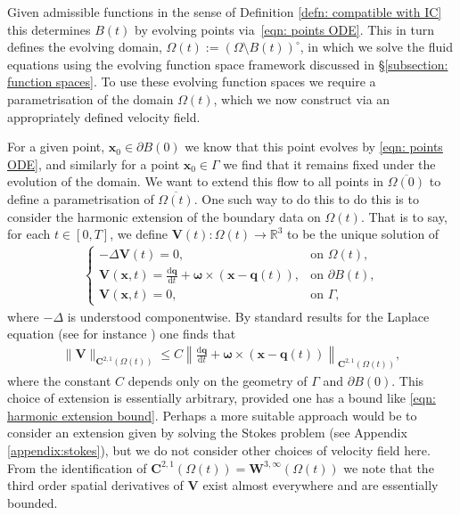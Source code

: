 \documentclass[a4paper]{amsart}
\numberwithin{equation}{section}
\theoremstyle{plain}
\newcommand{\mbf}[1]{\mathbf{#1}}
\newcommand{\mbb}[1]{\mathbb{#1}}
\begin{document}
Given admissible functions in the sense of Definition \ref{defn: compatible with IC} this determines $B(t)$ by evolving points via~\eqref{eqn: points ODE}.
This in turn defines the evolving domain, $\Omega(t) := (\Omega\setminus B(t))^\circ$, in which we solve the fluid equations using the evolving function space framework discussed in \S\ref{subsection: function spaces}.
To use these evolving function spaces we require a parametrisation of the domain $\Omega(t)$, which we now construct via an appropriately defined velocity field.

For a given point, $\mbf{x}_0 \in \partial B(0)$ we know that this point evolves by \eqref{eqn: points ODE}, and similarly for a point $\mbf{x}_0 \in \Gamma$ we find that it remains fixed under the evolution of the domain.
We want to extend this flow to all points in $\overline{\Omega(0)}$ to define a parametrisation of $\overline{\Omega(t)}$.
One such way to do this to do this is to consider the harmonic extension of the boundary data on $\Omega(t)$.
That is to say, for each $t \in [0,T]$, we define $\mbf{V}(t) : \Omega(t) \rightarrow \mbb{R}^3$ to be the unique solution of
\begin{gather}
	\begin{cases}
	-\Delta \mbf{V}(t) = 0, &\text{on } \Omega(t),\\
	\mbf{V}(\mbf{x},t) = \frac{\mathrm{d}\mbf{q}}{\mathrm{d}t} + \boldsymbol{\omega} \times (\mbf{x} - \mbf{q}(t)), &\text{on } \partial B(t),\\
	\mbf{V}(\mbf{x},t) = 0, &\text{on } \Gamma,
\end{cases}\label{eqn: velocity harmonic extension}
\end{gather}
where $-\Delta$ is understood componentwise.
By standard results for the Laplace equation (see for instance \cite{gilbarg1977elliptic}) one finds that
\begin{align}
	\|\mbf{V}\|_{\mbf{C}^{2,1}(\Omega(t))} \leq C \left\| \frac{\mathrm{d}\mbf{q}}{\mathrm{d}t} + \boldsymbol{\omega} \times (\mbf{x} - \mbf{q}(t)) \right\|_{\mbf{C}^{2,1}(\Omega(t))}, \label{eqn: harmonic extension bound}
\end{align}
where the constant $C$ depends only on the geometry of $\Gamma$ and $\partial B(0)$.
This choice of extension is essentially arbitrary, provided one has a bound like \eqref{eqn: harmonic extension bound}.
Perhaps a more suitable approach would be to consider an extension given by solving the Stokes problem (see Appendix \ref{appendix:stokes}), but we do not consider other choices of velocity field here.
From the identification of $\mbf{C}^{2,1}(\Omega(t)) = \mbf{W}^{3,\infty}(\Omega(t))$ we note that the third order spatial derivatives of $\mbf{V}$ exist almost everywhere and are essentially bounded.
\end{document}
